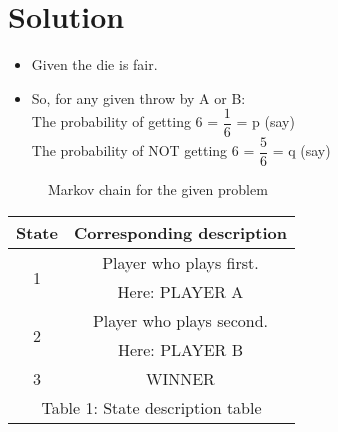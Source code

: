 \documentclass[journal,12pt,twocolumn]{IEEEtran}
\theoremstyle{definition}
\begin{document}
\section{\Large Solution}
\begin{itemize}
    \item Given the die is fair.
    \item So, for any given throw by A or B:\\
    The probability of getting 6 = $\dfrac{1}{6}$ = p (say)\\
    The probability of NOT getting 6 = $\dfrac{5}{6}$ = q (say)
\end{itemize}
\begin{figure}[h]
\begin{center}
        \caption{Markov chain for the given problem}
        \label{fig: Fig1}
\end{center}
\end{figure}
\begin{table}[h]
    \begin{center}
    \begin{tabular}{|c|c|}
        \hline
        State & Corresponding description \\
        \hline
        \multirow{ 2}{*}{1} & Player who plays first.\\
        & Here: PLAYER A\\
        \hline
        \multirow{ 2}{*}{2} & Player who plays second.\\
        & Here: PLAYER B\\
        \hline
        3 & WINNER\\
        \hline
        \multicolumn{2}{c}{Table 1: State description table}
    \end{tabular}
    \end{center}
\end{table}
\end{document}
